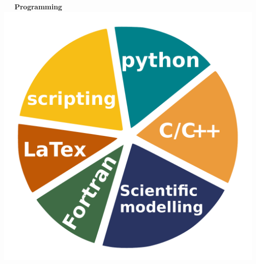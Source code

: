 \begin{minipage}{0.32\columnwidth}
\begin{flushright}
        \textcolor{my_blue}{\bf\large \textbullet~~ Programming}\\
        \includegraphics[scale=0.3]{figs/programming1.pdf}\\

    \end{flushright}
\end{minipage}
\begin{minipage}{0.1\columnwidth}
\end{minipage}
\begin{minipage}{0.1\columnwidth}
\end{minipage}
\begin{minipage}{0.1\columnwidth}
\end{minipage}
